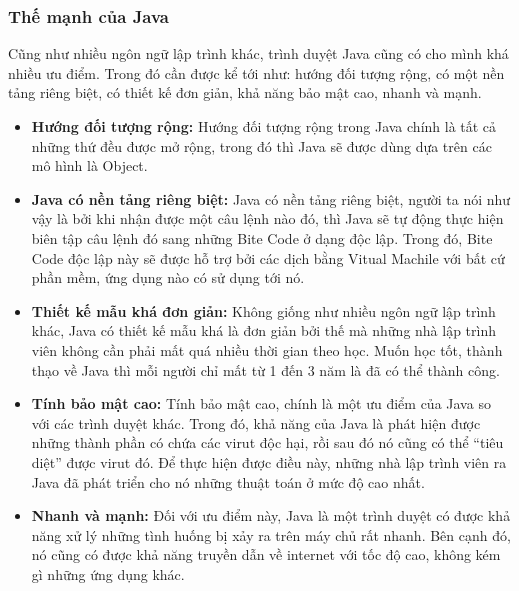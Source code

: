 \subsubsection{Thế mạnh của Java}

Cũng như nhiều ngôn ngữ lập trình khác, trình duyệt Java cũng có cho mình khá nhiều ưu điểm. Trong đó cần được kể tới như: hướng đối tượng rộng, có một nền tảng riêng biệt, có thiết kế đơn giản, khả năng bảo mật cao, nhanh và mạnh.
\begin{itemize}
    \item \textbf{Hướng đối tượng rộng:} Hướng đối tượng rộng trong Java chính là tất cả những thứ đều được mở rộng, trong đó thì Java sẽ được dùng dựa trên các mô hình là Object.
    \item \textbf{Java có nền tảng riêng biệt:} Java có nền tảng riêng biệt, người ta nói như vậy là bởi khi nhận được một câu lệnh nào đó, thì Java sẽ tự động thực hiện biên tập câu lệnh đó sang những Bite Code ở dạng độc lập. Trong đó, Bite Code độc lập này sẽ được hỗ trợ bởi các dịch bằng Vitual Machile với bất cứ phần mềm, ứng dụng nào có sử dụng tới nó.
    \item \textbf{Thiết kế mẫu khá đơn giản:} Không giống như nhiều ngôn ngữ lập trình khác, Java có thiết kế mẫu khá là đơn giản bởi thế mà những nhà lập trình viên không cần phải mất quá nhiều thời gian theo học. Muốn học tốt, thành thạo về Java thì mỗi người chỉ mất từ 1 đến 3 năm là đã có thể thành công.
    \item \textbf{Tính bảo mật cao:} Tính bảo mật cao, chính là một ưu điểm của Java so với các trình duyệt khác. Trong đó, khả năng của Java là phát hiện được những thành phần có chứa các virut độc hại, rồi sau đó nó cũng có thể “tiêu diệt” được  virut đó. Để thực hiện được điều này, những nhà lập trình viên ra Java đã phát triển cho nó những thuật toán ở mức độ cao nhất.
    \item \textbf{Nhanh và mạnh:} Đối với ưu điểm này, Java là một trình duyệt có được khả năng xử lý những tình huống bị xảy ra trên máy chủ rất nhanh. Bên cạnh đó, nó cũng có được khả năng truyền dẫn về internet với tốc độ cao, không kém gì những ứng dụng khác.
\end{itemize}

